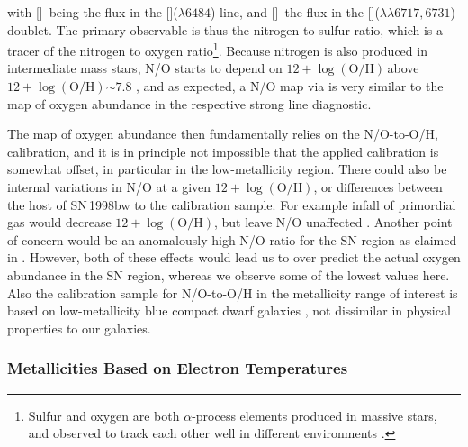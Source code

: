 \documentclass[traditabstract]{aa}
\newcommand{\oh}{$12+\log(\mathrm{O/H})$}
\newcommand{\sii}{[\ion{S}{ii}]}
\newcommand{\nii}{[\ion{N}{ii}]}
\begin{document}
with \nii\, being the flux in the \nii($\lambda6484$) line, and \sii\, the flux in the \sii($\lambda\lambda6717,6731$) doublet. The primary observable is thus the nitrogen to sulfur ratio, which is a tracer of the nitrogen to oxygen ratio\footnote{Sulfur and oxygen are both $\alpha$-process elements produced in massive stars, and observed to track each other well in different environments \citep[see e.g. Figure 6 in][]{2006A&A...448..955I}.}. Because nitrogen is also produced in intermediate mass stars, N/O starts to depend on \oh\,above \oh$\sim 7.8$ \citep[e.g.][]{1999ApJ...511..639I, 2013A&A...549A..25P}, and as expected, a N/O map via \citet{2010ApJ...715L.128A} is very similar to the map of oxygen abundance in the respective strong line diagnostic. 

The map of oxygen abundance then fundamentally relies on the N/O-to-O/H, calibration, and it is in principle not impossible that the applied calibration is somewhat offset, in particular in the low-metallicity region. There could also be internal variations in N/O at a given \oh, or differences between the host of SN\,1998bw to the calibration sample. For example infall of primordial gas would decrease \oh, but leave N/O unaffected \citep{2016ApJ...823L..24K}. Another point of concern would be an anomalously high N/O ratio for the SN region as claimed in \citet{2006A&A...454..103H}. However, both of these effects would lead us to over predict the actual oxygen abundance in the SN region, whereas we observe some of the lowest values here. Also the calibration sample for N/O-to-O/H in the metallicity range of interest is based on low-metallicity blue compact dwarf galaxies \citep{1999ApJ...511..639I}, not dissimilar in physical properties to our galaxies. %

\subsubsection{Metallicities Based on Electron Temperatures}
\end{document}
